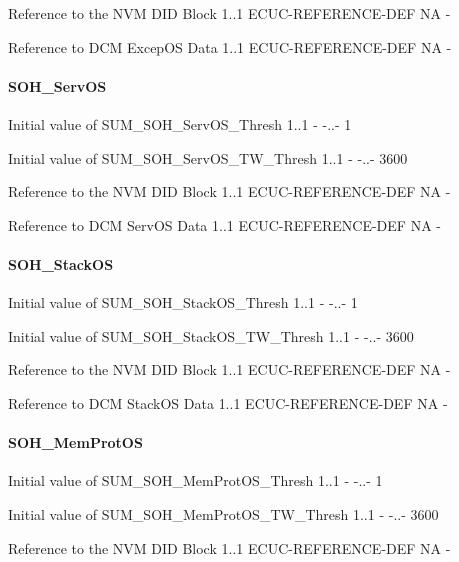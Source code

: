 {
{Reference to the NVM DID Block}
{1..1}
{ECUC-REFERENCE-DEF}
{NA}
{-}}

{
{Reference to DCM ExcepOS Data}
{1..1}
{ECUC-REFERENCE-DEF}
{NA}
{-}}


\paragraph{SOH_ServOS}
{
{Initial value of SUM_SOH_ServOS_Thresh}
{1..1}
{-}
{-..-}
{1}}

{
{Initial value of SUM_SOH_ServOS_TW_Thresh}
{1..1}
{-}
{-..-}
{3600}}

{
{Reference to the NVM DID Block}
{1..1}
{ECUC-REFERENCE-DEF}
{NA}
{-}}

{
{Reference to DCM ServOS Data}
{1..1}
{ECUC-REFERENCE-DEF}
{NA}
{-}}

\paragraph{SOH_StackOS}
{
{Initial value of SUM_SOH_StackOS_Thresh}
{1..1}
{-}
{-..-}
{1}}

{
{Initial value of SUM_SOH_StackOS_TW_Thresh}
{1..1}
{-}
{-..-}
{3600}}

{
{Reference to the NVM DID Block}
{1..1}
{ECUC-REFERENCE-DEF}
{NA}
{-}}

{
{Reference to DCM StackOS Data}
{1..1}
{ECUC-REFERENCE-DEF}
{NA}
{-}}

\paragraph{SOH_MemProtOS}
{
{Initial value of SUM_SOH_MemProtOS_Thresh}
{1..1}
{-}
{-..-}
{1}}

{
{Initial value of SUM_SOH_MemProtOS_TW_Thresh}
{1..1}
{-}
{-..-}
{3600}}

{
{Reference to the NVM DID Block}
{1..1}
{ECUC-REFERENCE-DEF}
{NA}
{-}}


